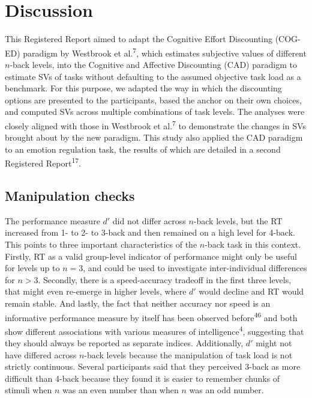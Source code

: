 \documentclass[
  man,floatsintext]{apa6}
\begin{document}
\hypertarget{discussion}{%
\section{Discussion}\label{discussion}}

This Registered Report aimed to adapt the Cognitive Effort Discounting (COG-ED) paradigm by Westbrook et al.\textsuperscript{7}, which estimates subjective values of different \(n\)-back levels, into the Cognitive and Affective Discounting (CAD) paradigm to estimate SVs of tasks without defaulting to the assumed objective task load as a benchmark.
For this purpose, we adapted the way in which the discounting options are presented to the participants, based the anchor on their own choices, and computed SVs across multiple combinations of task levels.
The analyses were closely aligned with those in Westbrook et al.\textsuperscript{7} to demonstrate the changes in SVs brought about by the new paradigm.
This study also applied the CAD paradigm to an emotion regulation task, the results of which are detailed in a second Registered Report\textsuperscript{17}.

\hypertarget{manipulation-checks-1}{%
\subsection{Manipulation checks}\label{manipulation-checks-1}}

The performance measure \(d'\) did not differ across \(n\)-back levels, but the RT increased from 1- to 2- to 3-back and then remained on a high level for 4-back.
This points to three important characteristics of the \(n\)-back task in this context.
Firstly, RT as a valid group-level indicator of performance might only be useful for levels up to \(n=3\), and could be used to investigate inter-individual differences for \(n>3\).
Secondly, there is a speed-accuracy tradeoff in the first three levels, that might even re-emerge in higher levels, where \(d'\) would decline and RT would remain stable.
And lastly, the fact that neither accuracy nor speed is an informative performance measure by itself has been observed before\textsuperscript{46} and both show different associations with various measures of intelligence\textsuperscript{4}, suggesting that they should always be reported as separate indices.
Additionally, \(d'\) might not have differed across \(n\)-back levels because the manipulation of task load is not strictly continuous.
Several participants said that they perceived 3-back as more difficult than 4-back because they found it is easier to remember chunks of stimuli when \(n\) was an even number than when \(n\) was an odd number.
\end{document}
